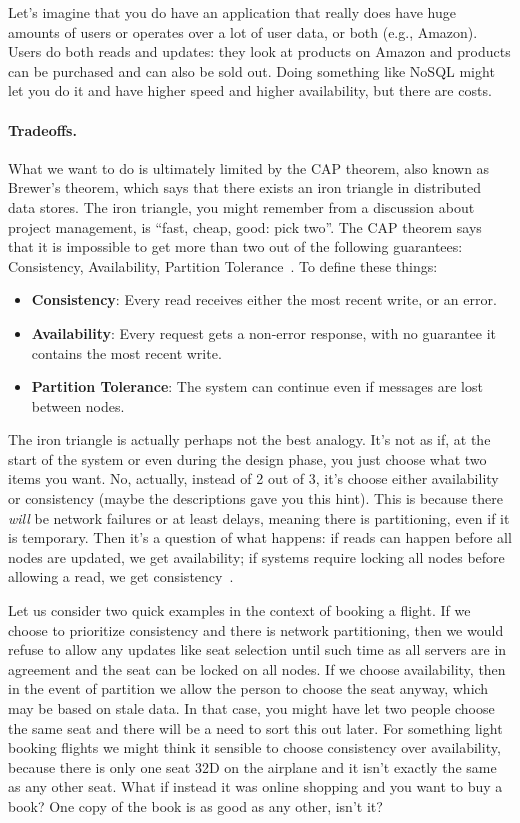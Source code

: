 Let's imagine that you do have an application that really does have huge amounts of users or operates over a lot of user data, or both (e.g., Amazon). Users do both reads and updates: they look at products on Amazon and products can be purchased and can also be sold out. Doing something like NoSQL might let you do it and have higher speed and higher availability, but there are costs. 

\paragraph{Tradeoffs.} What we want to do is ultimately limited by the CAP theorem, also known as Brewer's theorem, which says that there exists an iron triangle in distributed data stores. The iron triangle, you might remember from a discussion about project management, is ``fast, cheap, good: pick two''. The CAP theorem says that it is impossible to get more than two out of the following guarantees: Consistency, Availability, Partition Tolerance~\cite{brewercap}. To define these things:

\begin{itemize}
	\item \textbf{Consistency}: Every read receives either the most recent write, or an error.
	\item \textbf{Availability}: Every request gets a non-error response, with no guarantee it contains the most recent write.
	\item \textbf{Partition Tolerance}: The system can continue even if messages are lost between nodes.
\end{itemize}

The iron triangle is actually perhaps not the best analogy. It's not as if, at the start of the system or even during the design phase, you just choose what two items you want. No, actually, instead of 2 out of 3, it's choose either availability or consistency (maybe the descriptions gave you this hint). This is because there \textit{will} be network failures or at least delays, meaning there is partitioning, even if it is temporary. Then it's a question of what happens: if reads can happen before all nodes are updated, we get availability; if systems require locking all nodes before allowing a read, we get consistency~\cite{bettercap}.

Let us consider two quick examples in the context of booking a flight. If we choose to prioritize consistency and there is network partitioning, then we would refuse to allow any updates like seat selection until such time as all servers are in agreement and the seat can be locked on all nodes. If we choose availability, then in the event of partition we allow the person to choose the seat anyway, which may be based on stale data. In that case, you might have let two people choose the same seat and there will be a need to sort this out later. For something light booking flights we might think it sensible to choose consistency over availability, because there is only one seat 32D on the airplane and it isn't exactly the same as any other seat. What if instead it was online shopping and you want to buy a book? One copy of the book is as good as any other, isn't it?


